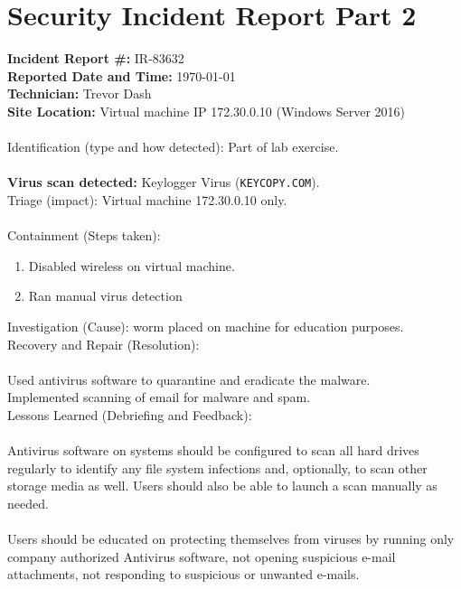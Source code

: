 \documentclass[a4paper]{article}
\begin{document}
	\section*{Security Incident Report Part 2}
	\textbf{Incident Report \#:} IR-83632\\
	\textbf{Reported Date and Time:} \today\\
	\textbf{Technician:} Trevor Dash\\
	\textbf{Site Location:} Virtual machine IP 172.30.0.10 (Windows Server 2016)\\
        \\
	Identification (type and how detected): Part of lab exercise.\\
        \\
        \textbf{Virus scan detected:} Keylogger Virus (\texttt{KEYCOPY.COM}).\\
        Triage (impact): Virtual machine 172.30.0.10 only.\\
        \\
        Containment (Steps taken):
        \begin{enumerate}
                \item Disabled wireless on virtual machine.
                \item Ran manual virus detection
	\end{enumerate}
        Investigation (Cause): worm placed on machine for education purposes.\\
        Recovery and Repair (Resolution):\\
        \\
        Used antivirus software to quarantine and eradicate the malware.\\
        Implemented scanning of email for malware and spam.\\
        Lessons Learned (Debriefing and Feedback):\\
        \\
        Antivirus software on systems should be configured to scan all hard drives regularly to
        identify any file system infections and, optionally, to scan other storage media as well.
        Users should also be able to launch a scan manually as needed.\\
        \\
        Users should be educated on protecting themselves from viruses by running only company
        authorized Antivirus software, not opening suspicious e-mail attachments, not responding
        to suspicious or unwanted e-mails.\\
        
\end{document}
